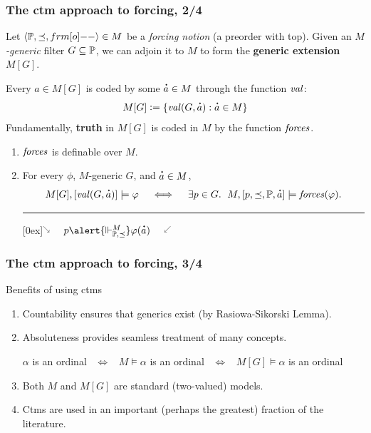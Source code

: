 \documentclass[english]{beamer}
\begin{document}
\begin{frame}
  \frametitle{The ctm approach to forcing, 2/4}
  Let $\lb \PP, {\preceq} ,\1\rb \in M$ be a \emph{forcing notion} (a preorder with top). Given 
  an \emph{$M$-generic} filter $G\subseteq \mathbb{P}$, 
  we can adjoin it to $M$ to form the
  \textbf{generic extension} $M[G]$.
  \pause

  Every $a\in M[G]$ is coded by
  some $\punto{a}\in M$ through the function $\operatorname{\mathit{val}}$:
  \[
  M[G]\defi \{ \val(G,\punto{a}) : \punto{a}\in M\}
  \]
  Fundamentally, \textbf{truth} in $M[G]$ is coded in $M$ by the
  function $\mathit{forces}$.
  \pause
  \begin{theorem}
    \begin{enumerate}
    \item $\mathit{forces}$ is definable over $M$.
    \item For every $\phi$, $M$-generic $G$, and $\punto{a}\in M$,
      \[
      M[G], [\val(G,\punto{a})] \models \phi
      \quad      \iff  \quad 
      \exists p\in G.\ \; M, [p,\preceq,\PP, \punto{a}]  \models
      \forceisa(\phi).
      \]
      \pause
      \rule{21em}{0pt}
      \raisebox{1.6ex}[0ex]{$\overset{\searrow}{}$ \ \ 
        $p \alert{\forces^M_{\PP,\preceq}} \phi(\punto{a})$
        \  \ $\overset{\swarrow}{}$}
    \end{enumerate}
  \end{theorem} 
\end{frame}

\begin{frame}
  \frametitle{The ctm approach to forcing, 3/4}
  \begin{block}{Benefits of using ctms}
    \begin{enumerate}
    \item<+-> Countability ensures that generics exist (by
      Rasiowa-Sikorski Lemma).
    \item<+-> Absoluteness provides seamless
      treatment of many concepts.
      \begin{center}
        $\alpha$ is an ordinal \ $\iff$ \  $M\models \alpha$ is
        an ordinal \  $\iff$ \  $M[G]\models \alpha$ is an ordinal
      \end{center}
    \item<+-> Both $M$ and $M[G]$ are standard (two-valued) models.
    \item<+-> Ctms are
      used in an important (perhaps the greatest) fraction of the literature.
    \end{enumerate}
  \end{block}
\end{frame}
\end{document}
